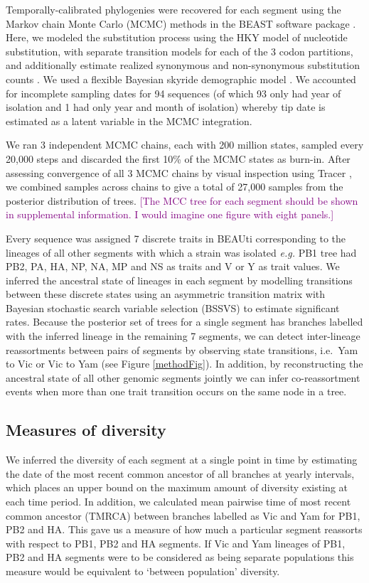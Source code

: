 \documentclass[11pt,oneside,letterpaper]{article}
\def\tbc#1{\textcolor{purple}{[#1]}}
\begin{document}
Temporally-calibrated phylogenies were recovered for each segment using the Markov chain Monte Carlo (MCMC) methods in the BEAST software package \cite{drummond2012}.
Here, we modeled the substitution process using the HKY model of nucleotide substitution, with separate transition models for each of the 3 codon partitions, and additionally estimate realized synonymous and non-synonymous substitution counts \cite{obrien2009}.
We used a flexible Bayesian skyride demographic model \cite{minin2008}.
We accounted for incomplete sampling dates for 94 sequences (of which 93 only had year of isolation and 1 had only year and month of isolation) whereby tip date is estimated as a latent variable in the MCMC integration.

We ran 3 independent MCMC chains, each with 200 million states, sampled every 20,000 steps and discarded the first 10\% of the MCMC states as burn-in.
After assessing convergence of all 3 MCMC chains by visual inspection using Tracer \cite{tracer}, we combined samples across chains to give a total of 27,000 samples from the posterior distribution of trees.
\tbc{The MCC tree for each segment should be shown in supplemental information.  I would imagine one figure with eight panels.}

Every sequence was assigned 7 discrete traits in BEAUti corresponding to the lineages of all other segments with which a strain was isolated \textit{e.g.} PB1 tree had PB2, PA, HA, NP, NA, MP and NS as traits and V or Y as trait values.
We inferred the ancestral state of lineages in each segment by modelling transitions between these discrete states using an asymmetric transition matrix \cite{lemey2009} with Bayesian stochastic search variable selection (BSSVS) to estimate significant rates. Because the posterior set of trees for a single segment has branches labelled with the inferred lineage in the remaining 7 segments, we can detect inter-lineage reassortments between pairs of segments by observing state transitions, i.e.\ Yam to Vic or Vic to Yam (see Figure \ref{methodFig}). 
In addition, by reconstructing the ancestral state of all other genomic segments jointly we can infer co-reassortment events when more than one trait transition occurs on the same node in a tree.

\subsection*{Measures of diversity}
We inferred the diversity of each segment at a single point in time by estimating the date of the most recent common ancestor of all branches at yearly intervals, which places an upper bound on the maximum amount of diversity existing at each time period.
In addition, we calculated mean pairwise time of most recent common ancestor (TMRCA) between branches labelled as Vic and Yam for PB1, PB2 and HA.
This gave us a measure of how much a particular segment reassorts with respect to PB1, PB2 and HA segments.
If Vic and Yam lineages of PB1, PB2 and HA segments were to be considered as being separate populations this measure would be equivalent to `between population' diversity.
\end{document}
